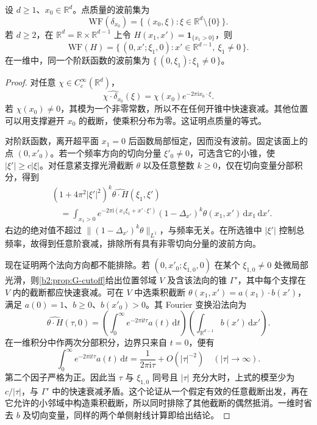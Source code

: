 \begin{proposition}[两个基本波前集]\label{b2:prop:G-elementary-wavefront}
设 \(d\ge1\)、\(x_0\in\mathbb R^d\)。点质量的波前集为
\[
 \mathrm{WF}(\delta_{x_0})
 =\{\,(x_0,\xi):\xi\in\mathbb R^d\setminus\{0\}\,\}.
\]
若 \(d\ge2\)，在 \(\mathbb R^d=\mathbb R\times\mathbb R^{d-1}\) 上令
\(H(x_1,x')=\mathbf1_{\{x_1>0\}}\)，则
\[
 \mathrm{WF}(H)
 =\{\,(0,x';\xi_1,0):x'\in\mathbb R^{d-1},\ \xi_1\ne0\,\}.
\]
在一维中，同一个阶跃函数的波前集为 \(\{\,(0,\xi_1):\xi_1\ne0\,\}\)。
\end{proposition}
\begin{proof}
对任意 \(\chi\in C_c^\infty(\mathbb R^d)\)，
\[
 \widehat{\chi\cdot\delta_{x_0}}(\xi)
 =\chi(x_0)e^{-2\pi\mathrm ix_0\cdot\xi}.
\]
若 \(\chi(x_0)\ne0\)，其模为一个非零常数，所以不在任何开锥中快速衰减。其他位置可以用支撑避开 \(x_0\) 的截断，使乘积分布为零。这证明点质量的等式。

对阶跃函数，离开超平面 \(x_1=0\) 后函数局部恒定，因而没有波前。固定该面上的点 \((0,x'_0)\)。若一个频率方向的切向分量 \(\xi'_0\ne0\)，可选含它的小锥，使 \(|\xi'|\ge c|\xi|\)。对任意紧支撑光滑截断 \(\theta\) 以及任意整数 \(k\ge0\)，仅在切向变量分部积分，得到
\[
 \begin{aligned}
 &(1+4\pi^2|\xi'|^2)^k
       \widehat{\theta\cdot H}(\xi_1,\xi')\\
 &\quad=\int_{x_1>0}e^{-2\pi\mathrm i(x_1\xi_1+x'\cdot\xi')}
        (1-\Delta_{x'})^k\theta(x_1,x')\,\mathrm dx_1\,\mathrm dx'.
 \end{aligned}
\]
右边的绝对值不超过 \(\|(1-\Delta_{x'})^k\theta\|_{L^1}\)，与频率无关。在所选锥中 \(|\xi'|\) 控制总频率，故得到任意阶衰减，排除所有具有非零切向分量的波前方向。

现在证明两个法向方向都不能排除。若 \((0,x'_0;\xi_{1,0},0)\) 在某个 \(\xi_{1,0}\ne0\) 处微局部光滑，则\cref{b2:prop:G-cutoff}给出位置邻域 \(V\) 及含该法向的锥 \(\Gamma'\)，其中每个支撑在 \(V\) 内的截断都应快速衰减。可在 \(V\) 中选乘积截断
\(\theta(x_1,x')=a(x_1)\cdot b(x')\)，满足 \(a(0)=1\)、\(b\ge0\)、\(b(x'_0)>0\)。其 Fourier 变换沿法向为
\[
 \widehat{\theta\cdot H}(\tau,0)
 =\left(\int_0^\infty e^{-2\pi\mathrm it\tau}a(t)\,\mathrm dt\right)
   \left(\int_{\mathbb R^{d-1}}b(x')\,\mathrm dx'\right).
\]
在一维积分中作两次分部积分，边界只来自 \(t=0\)，便有
\[
 \int_0^\infty e^{-2\pi\mathrm it\tau}a(t)\,\mathrm dt
 =\frac1{2\pi\mathrm i\tau}+O(|\tau|^{-2})
 \quad(|\tau|\to\infty).
\]
第二个因子严格为正。因此当 \(\tau\) 与 \(\xi_{1,0}\) 同号且 \(|\tau|\) 充分大时，上式的模至少为 \(c/|\tau|\)，与 \(\Gamma'\) 中的快速衰减矛盾。这个论证从一个假定有效的任意截断出发，再在它允许的小邻域中构造乘积截断，所以同时排除了其他截断的偶然抵消。一维时省去 \(b\) 及切向变量，同样的两个单侧射线计算即给出结论。
\end{proof}

